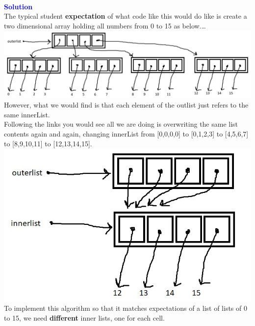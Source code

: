 \documentclass[a4paper,10pt]{article}
\newcommand{\solution}[1]{}
\renewcommand{\solution}[1]{\textcolor{blue}{\\ \textbf{Solution}} \\#1}
\begin{document}
\solution{
The typical student \textbf{expectation} of what code like this would do like is create a two dimensional array holding all numbers from 0 to 15 as below.\ldots\\

\includegraphics[width=\linewidth]{typical_student_expectation_before_activity.jpg}
\vspace{1em}
However, what we would find is that each element of the outlist just refers to the same innerList.\\
Following the links you would see all we are doing is overwriting the same list contents again and again, changing innerList from [0,0,0,0] to [0,1,2,3] to [4,5,6,7] to [8,9,10,11] to [12,13,14,15].\\

\includegraphics{solution-image.jpg}\vspace{1em}\\
To implement this algorithm so that it matches expectations of a list of lists of 0 to 15, we need \textbf{different} inner lists, one for each cell.
}
\end{document}
